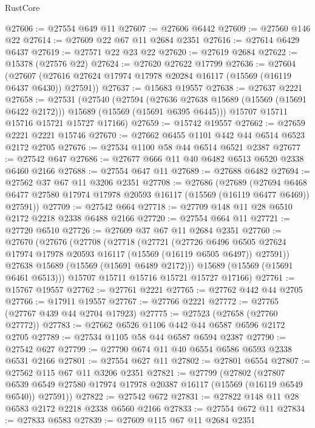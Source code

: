 \begin{lexlean}{RustCore}
\begin{coremodule}
@27606 := @27554 @649 @11
@27607 := @27606 @6442
@27609 := @27560 @146 @22
@27614 := @27609 @22 @67 @11 @2684 @2351
@27616 := @27614 @6429 @6437
@27619 := @27571 @22 @23 @22
@27620 := @27619 @2684
@27622 := @15378 (@27576 @22)
@27624 := @27620 @27622 @17799
@27636 := @27604
    (@27607 (@27616 @27624 @17974 @17978 @20284 @16117 (@15569 (@16119 @6437 @6430)) @27591))
@27637 := @15683 @19557
@27638 := @27637 @2221
@27658 := @27531
    (@27540
      (@27594
        (@27636 @27638 @15689 (@15569 (@15691 @6422 @2172)))
        @15689
        (@15569 (@15691 @6395 @6445)))
      @15707
      @15711
      @15716
      @15721
      @15727
      @17166)
@27659 := @15742 @19557
@27662 := @27659 @2221 @2221 @15746
@27670 := @27662 @6455 @1101 @442 @44 @6514 @6523 @2172 @2705
@27676 := @27534 @1100 @58 @44 @6514 @6521 @2387
@27677 := @27542 @647
@27686 := @27677 @666 @11 @40 @6482 @6513 @6520 @2338 @6460 @2166
@27688 := @27554 @647 @11
@27689 := @27688 @6482
@27694 := @27562 @37 @67 @11 @3206 @2351
@27708 := @27686
    (@27689
      (@27694 @6468 @6477 @27580 @17974 @17978 @20593 @16117 (@15569 (@16119 @6477 @6469)) @27591))
@27709 := @27542 @664
@27718 := @27709 @148 @11 @28 @6510 @2172 @2218 @2338 @6488 @2166
@27720 := @27554 @664 @11
@27721 := @27720 @6510
@27726 := @27609 @37 @67 @11 @2684 @2351
@27760 := @27670
    (@27676
      (@27708
        (@27718
          (@27721
            (@27726
              @6496
              @6505
              @27624
              @17974
              @17978
              @20593
              @16117
              (@15569 (@16119 @6505 @6497))
              @27591))
          @27638
          @15689
          (@15569 (@15691 @6489 @2172)))
        @15689
        (@15569 (@15691 @6461 @6513)))
      @15707
      @15711
      @15716
      @15721
      @15727
      @17166)
@27761 := @15767 @19557
@27762 := @27761 @2221
@27765 := @27762 @442 @44 @2705
@27766 := @17911 @19557
@27767 := @27766 @2221
@27772 := @27765 (@27767 @439 @44 @2704 @17923)
@27775 := @27523 (@27658 (@27760 @27772))
@27783 := @27662 @6526 @1106 @442 @44 @6587 @6596 @2172 @2705
@27789 := @27534 @1105 @58 @44 @6587 @6594 @2387
@27790 := @27542 @627
@27799 := @27790 @674 @11 @40 @6554 @6586 @6593 @2338 @6531 @2166
@27801 := @27554 @627 @11
@27802 := @27801 @6554
@27807 := @27562 @115 @67 @11 @3206 @2351
@27821 := @27799
    (@27802
      (@27807 @6539 @6549 @27580 @17974 @17978 @20387 @16117 (@15569 (@16119 @6549 @6540)) @27591))
@27822 := @27542 @672
@27831 := @27822 @148 @11 @28 @6583 @2172 @2218 @2338 @6560 @2166
@27833 := @27554 @672 @11
@27834 := @27833 @6583
@27839 := @27609 @115 @67 @11 @2684 @2351

\end{coremodule}
\end{lexlean}
